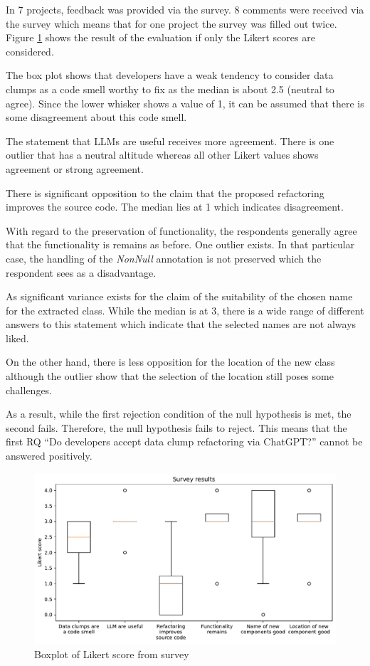 In 7 projects, feedback was provided via the survey. 8 comments were received via the survey which means that for one project the survey was filled out twice. Figure \ref{fig:boxplot_survey} shows the result of the evaluation if only the Likert scores are considered. 

The box plot shows that developers have a weak tendency to consider data clumps as a code smell worthy to fix as the median is about 2.5 (neutral to agree). Since the lower whisker shows a value of 1, it can be assumed that there is some disagreement about this code smell.

The statement that \acp{LLM} are useful receives more agreement. There is one outlier that has a neutral altitude whereas all other Likert values shows agreement or strong agreement. 

There is significant opposition to the claim that the proposed refactoring improves the source code. The median lies at 1 which indicates disagreement. 

With regard to the preservation of functionality, the respondents generally agree that the functionality is remains as before. One outlier exists. In that particular case, the handling of the \textit{NonNull} annotation is not preserved which the respondent sees as a disadvantage. 

As significant variance exists for the claim of the suitability of the chosen name for the extracted class. While the median is at 3, there is a wide range of different answers to this statement which indicate that the selected names are not always liked. 

On the other hand, there is less opposition for the location of the new class although the outlier show that the selection of the location still poses some challenges. 

As a result, while the first rejection condition of the null hypothesis is met, the second fails. Therefore, the null hypothesis fails to reject. This means that the first RQ \enquote{Do developers accept data clump refactoring via ChatGPT?} cannot be answered positively.

\bigskip
\begin{figure}
    \centering
    \includegraphics[width=\columnwidth]{figures/chapter5/survey_results.pdf}
    \caption{Boxplot of Likert score from survey}
    \label{fig:boxplot_survey}
\end{figure}


